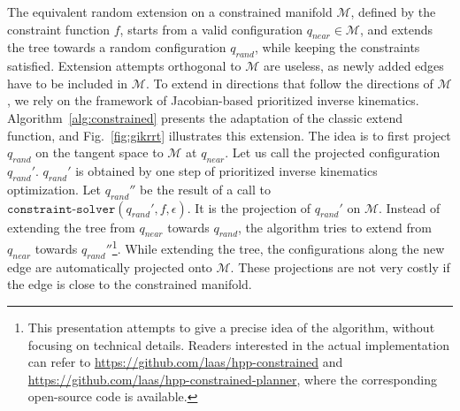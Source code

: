 \documentclass{article}
\begin{document}
The equivalent random  extension on a constrained manifold $\mathcal{M}$, 
defined by the constraint function $f$,
starts from a valid configuration $q_{near} \in \mathcal{M}$, and extends the tree
towards a random configuration $q_{rand}$, while keeping the constraints
satisfied. Extension attempts orthogonal to $\mathcal{M}$ are useless,
as newly added edges have to be included  in $\mathcal{M}$. To extend in directions
that follow the directions of $\mathcal{M}$, we rely on the framework of 
Jacobian-based prioritized inverse kinematics. Algorithm~\ref{alg:constrained} presents
the adaptation of the classic extend function, and Fig.~\ref{fig:gikrrt} illustrates this
extension. The idea is to first project $q_{rand}$ on the tangent
space to $\mathcal{M}$  at $q_{near}$. Let us call the projected configuration $q_{rand}'$.
$q_{rand}'$ is obtained by one step of prioritized inverse kinematics optimization. Let 
$q_{rand}''$  be the result of a call to $\texttt{constraint-solver}(q_{rand}',f,\epsilon)$.  It is 
the projection
of $q_{rand}'$ on $\mathcal{M}$. Instead of extending the tree from $q_{near}$ towards 
$q_{rand}$, the algorithm tries to extend from $q_{near}$ towards 
$q_{rand}''$\footnote{This presentation attempts to give a precise idea of the algorithm, without 
  focusing on technical details. Readers interested in the actual implementation can
  refer to \url{https://github.com/laas/hpp-constrained} and 
  \url{https://github.com/laas/hpp-constrained-planner}, where the corresponding open-source 
  code is available.}. While extending the tree,
the configurations along the new edge are automatically projected onto $\mathcal{M}$. These projections 
are not very costly if the edge is close to the constrained manifold.
\end{document}
